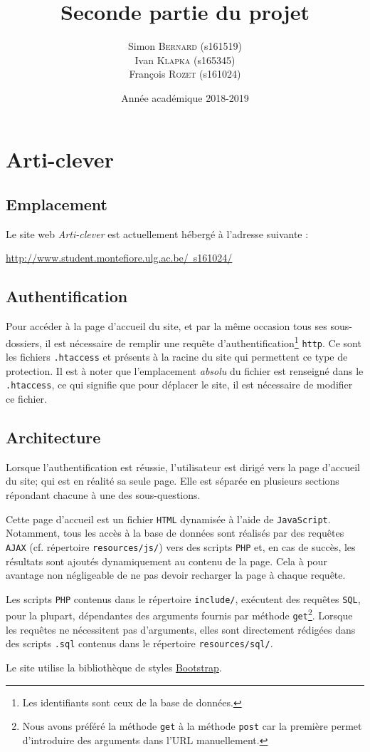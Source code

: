 \documentclass[a4paper, 12pt]{article}
\title{Seconde partie du projet}
\author{Simon \textsc{Bernard} (s161519)\\Ivan \textsc{Klapka} (s165345)\\François \textsc{Rozet} (s161024)\\}
\date{Année académique 2018-2019}
\begin{document}
	
	\section{Arti-clever}
	\subsection{Emplacement}
	Le site web \emph{Arti-clever} est actuellement hébergé à l'adresse suivante :
	\begin{center}
	    \href{http://www.student.montefiore.ulg.ac.be/~s161024/}{http://www.student.montefiore.ulg.ac.be/~s161024/}
	\end{center}
	\subsection{Authentification}
	Pour accéder à la page d'accueil du site, et par la même occasion tous ses sous-dossiers, il est nécessaire de remplir une requête d'authentification\footnote{Les identifiants sont ceux de la base de données.} \texttt{http}. Ce sont les fichiers \texttt{.htaccess} et  présents à la racine du site qui permettent ce type de protection. Il est à noter que l'emplacement \emph{absolu} du fichier  est renseigné dans le \texttt{.htaccess}, ce qui signifie que pour déplacer le site, il est nécessaire de modifier ce fichier.
	\subsection{Architecture}
	Lorsque l'authentification est réussie, l'utilisateur est dirigé vers la page d'accueil du site; qui est en réalité sa seule page. Elle est séparée en plusieurs sections répondant chacune à une des sous-questions. \par
	Cette page d'accueil est un fichier \texttt{HTML} dynamisée à l'aide de \texttt{JavaScript}. Notamment, tous les accès à la base de données sont réalisés par des requêtes \texttt{AJAX} (cf. répertoire \texttt{resources/js/}) vers des scripts \texttt{PHP} et, en cas de succès, les résultats sont ajoutés dynamiquement au contenu de la page. Cela à pour avantage non négligeable de ne pas devoir recharger la page à chaque requête. \par
	Les scripts \texttt{PHP} contenus dans le répertoire \texttt{include/}, exécutent des requêtes \texttt{SQL}, pour la plupart, dépendantes des arguments fournis par méthode \texttt{get}\footnote{Nous avons préféré la méthode \texttt{get} à la méthode \texttt{post} car la première permet d'introduire des arguments dans l'URL manuellement.}. Lorsque les requêtes ne nécessitent pas d'arguments, elles sont directement rédigées dans des scripts \texttt{.sql} contenus dans le répertoire \texttt{resources/sql/}. \par
	Le site utilise la bibliothèque de styles \href{https://getbootstrap.com/}{Bootstrap}.
\end{document}
